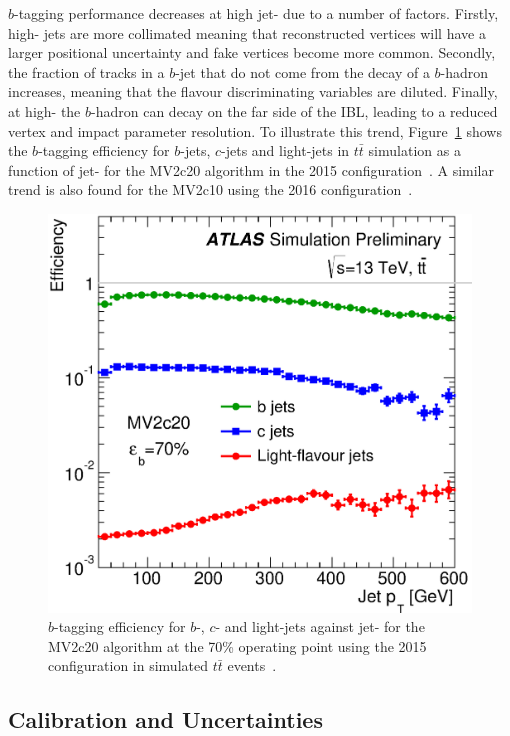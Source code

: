 $b$-tagging performance decreases at high jet-\pT{} due to a number of factors.
Firstly, high-\pT{} jets are more collimated meaning that reconstructed vertices
will have a larger positional uncertainty and fake vertices become more common.
Secondly, the fraction of tracks in a $b$-jet that do not come from the decay of a $b$-hadron increases,
meaning that the flavour discriminating variables are diluted.
Finally, at high-\pT{} the $b$-hadron can decay on the far side of the IBL, leading to a reduced vertex and impact parameter resolution.
To illustrate this trend, Figure~\ref{fig:obj-bjets_perf_pt} shows the $b$-tagging efficiency for $b$-jets, $c$-jets and light-jets in $t\bar{t}$ simulation as a function of jet-\pT{}
for the MV2c20 algorithm in the 2015 configuration~\cite{obj-bjets_algo_2015}. A similar trend is also found for the MV2c10 using the 2016 configuration~\cite{obj-bjets_algo_2016}.

\begin{figure}[!htb]
  \begin{center}
    \includegraphics[width=0.4\linewidth, angle=0]{figs/Objects/bjets_perf_pt.eps} 
  \end{center}
  \vspace{-1em}
  \caption[$b$-tagging efficiency for $b$-jets, $c$-jets and light-jets as a function of jet-\pT{} for the MV2c20 algorithm at the 70\% operating point in the 2015 configuration.]
          {\label{fig:obj-bjets_perf_pt} $b$-tagging efficiency for $b$-, $c$- and light-jets against jet-\pT{} 
            for the MV2c20 algorithm at the 70\% operating point using the 2015 configuration in simulated $t\bar{t}$ events~\cite{obj-bjets_algo_2015}.}
\end{figure}

\subsection{Calibration and Uncertainties}
\label{sec:obj-bjets_calib}


